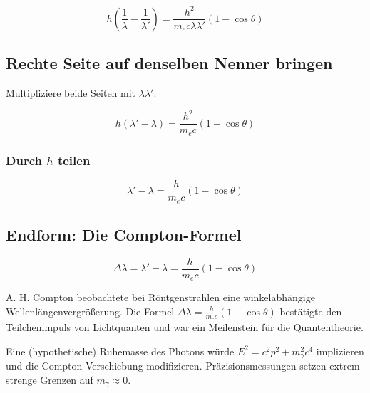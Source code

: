 \[
h \left( \frac{1}{\lambda} - \frac{1}{\lambda'} \right) = \frac{h^2}{m_e c \lambda \lambda'} (1 - \cos\theta)
\]

\subsection*{ Rechte Seite auf denselben Nenner bringen}

Multipliziere beide Seiten mit \( \lambda \lambda' \):

\[
h (\lambda' - \lambda) = \frac{h^2}{m_e c} (1 - \cos\theta)
\]

\subsubsection*{Durch \( h \) teilen}

\[
\lambda' - \lambda = \frac{h}{m_e c} (1 - \cos\theta)
\]

\subsection*{Endform: Die Compton-Formel}

\[
\boxed{
	\Delta \lambda = \lambda' - \lambda = \frac{h}{m_e c} (1 - \cos\theta)
}
\]


\begin{HistoryBox}
	A. H. Compton beobachtete bei Röntgenstrahlen eine winkelabhängige 
	Wellenlängenvergrößerung. Die Formel 
	\(\Delta\lambda=\tfrac{h}{m_ec}(1-\cos\theta)\) bestätigte den 
	Teilchenimpuls von Lichtquanten und war ein Meilenstein für die Quantentheorie.
\end{HistoryBox}


\begin{HypoBox}
	Eine (hypothetische) Ruhemasse des Photons würde \(E^2=c^2p^2+m_\gamma^2c^4\) implizieren 
	und die Compton-Verschiebung modifizieren. Präzisionsmessungen setzen extrem strenge 
	Grenzen auf \(m_\gamma\approx 0\).
\end{HypoBox}
